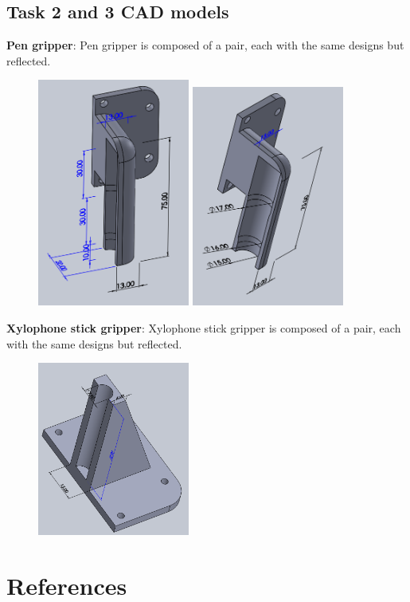 \documentclass[9pt, a4paper]{article}
\begin{document}
\subsection{Task 2 and 3 CAD models}
\textbf{Pen gripper}: 
Pen gripper is composed of a pair, each with the same designs but reflected.
\begin{figure}[h]
    \centering
    \includegraphics[width=5cm]{pen_right.png}
    \hspace{1cm}
    \includegraphics[width=5cm]{pen_right_2.png}
\end{figure}

\textbf{Xylophone stick gripper}: 
Xylophone stick gripper is composed of a pair, each with the same designs but
reflected.
\begin{figure}[h]
    \centering
    \includegraphics[width=5cm]{stick_holder.png}
\end{figure}


\pagebreak
\section{References}
\printbibliography
\end{document}

